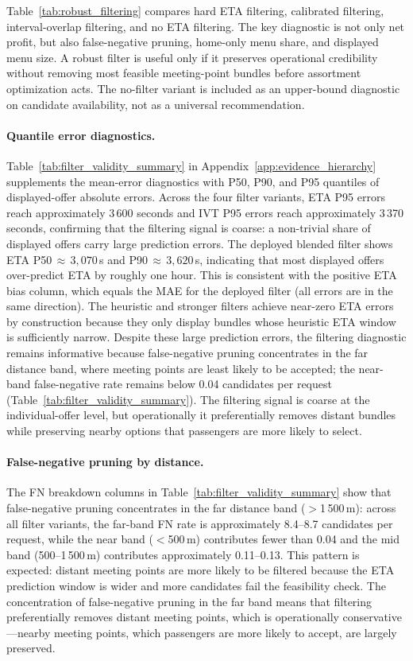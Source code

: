 Table~\ref{tab:robust_filtering} compares hard ETA filtering, calibrated filtering, interval-overlap filtering, and no ETA filtering. The key diagnostic is not only net profit, but also false-negative pruning, home-only menu share, and displayed menu size. A robust filter is useful only if it preserves operational credibility without removing most feasible meeting-point bundles before assortment optimization acts. The no-filter variant is included as an upper-bound diagnostic on candidate availability, not as a universal recommendation.

\paragraph{Quantile error diagnostics.}
Table~\ref{tab:filter_validity_summary} in Appendix~\ref{app:evidence_hierarchy} supplements the mean-error diagnostics with P50, P90, and P95 quantiles of displayed-offer absolute errors. Across the four filter variants, ETA P95 errors reach approximately 3\,600 seconds and IVT P95 errors reach approximately 3\,370 seconds, confirming that the filtering signal is coarse: a non-trivial share of displayed offers carry large prediction errors. The deployed blended filter shows ETA P50$\,{\approx}\,3{,}070$\,s and P90$\,{\approx}\,3{,}620$\,s, indicating that most displayed offers over-predict ETA by roughly one hour. This is consistent with the positive ETA bias column, which equals the MAE for the deployed filter (all errors are in the same direction). The heuristic and stronger filters achieve near-zero ETA errors by construction because they only display bundles whose heuristic ETA window is sufficiently narrow.
Despite these large prediction errors, the filtering diagnostic remains informative because false-negative pruning concentrates in the far distance band, where meeting points are least likely to be accepted; the near-band false-negative rate remains below 0.04 candidates per request (Table~\ref{tab:filter_validity_summary}). The filtering signal is coarse at the individual-offer level, but operationally it preferentially removes distant bundles while preserving nearby options that passengers are more likely to select.

\paragraph{False-negative pruning by distance.}
The FN breakdown columns in Table~\ref{tab:filter_validity_summary} show that false-negative pruning concentrates in the far distance band ($>$1\,500\,m): across all filter variants, the far-band FN rate is approximately 8.4--8.7 candidates per request, while the near band ($<$500\,m) contributes fewer than 0.04 and the mid band (500--1\,500\,m) contributes approximately 0.11--0.13. This pattern is expected: distant meeting points are more likely to be filtered because the ETA prediction window is wider and more candidates fail the feasibility check. The concentration of false-negative pruning in the far band means that filtering preferentially removes distant meeting points, which is operationally conservative---nearby meeting points, which passengers are more likely to accept, are largely preserved.

